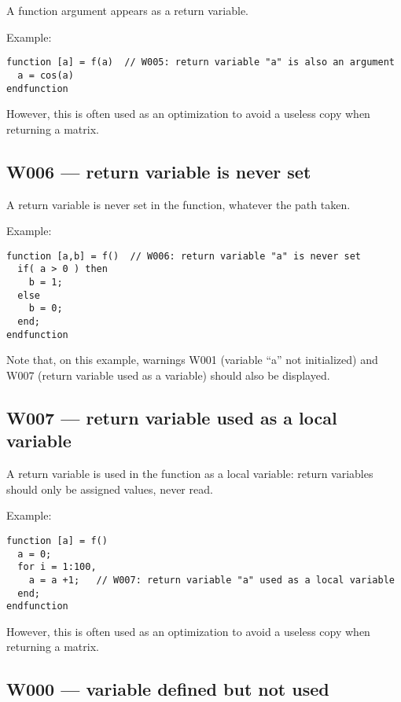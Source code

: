 A function argument appears as a return variable.



Example:\begin{verbatim}
function [a] = f(a)  // W005: return variable "a" is also an argument
  a = cos(a)
endfunction
\end{verbatim}




However, this is often used as an optimization to avoid
a useless copy when returning a matrix.



\subsection{W006 --- return variable is never set}




A return variable is never set in the function,
whatever the path taken.



Example:\begin{verbatim}
function [a,b] = f()  // W006: return variable "a" is never set
  if( a > 0 ) then
    b = 1;
  else
    b = 0;
  end;
endfunction
\end{verbatim}
Note that, on this example, warnings W001
(variable ``a'' not initialized)
and W007 (return variable used as a variable) should also be displayed.



\subsection{W007 --- return variable used as a local variable}




A return variable is used in the function as a local variable:
 return variables should only be assigned values, never read.



Example:\begin{verbatim}
function [a] = f()
  a = 0;
  for i = 1:100,
    a = a +1;   // W007: return variable "a" used as a local variable
  end;
endfunction
\end{verbatim}




However, this is often used as an optimization to avoid
a useless copy when returning a matrix.



\subsection{W000 --- variable defined but not used}


